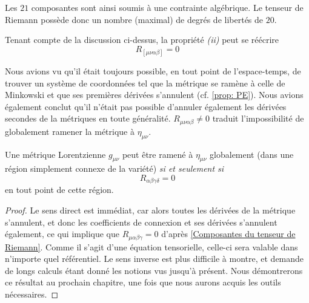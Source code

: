 Les $21$ composantes sont ainsi soumis à une contrainte algébrique. Le tenseur de Riemann possède donc un nombre (maximal) de degrés de libertés de $20$. 
\begin{rmk}
    Tenant compte de la discussion ci-dessus, la propriété \emph{(ii)} peut se réécrire 
    \begin{equation}
        R_{[\mu\nu\alpha\beta]} = 0
    \end{equation}
\end{rmk}
Nous avions vu qu'il était toujours possible, en tout point de l'espace-temps, de trouver un système de coordonnées tel que la métrique se ramène à celle de Minkowski et que ses premières dérivées s'annulent (cf. \ref{prop: PE}). Nous avions également conclut qu'il n'était pas possible d'annuler également les dérivées secondes de la métriques en toute généralité. $R_{\mu\nu\alpha\beta} \neq 0$ traduit l'impossibilité de globalement ramener la métrique à $\eta_{\mu\nu}$.
\begin{theoremframe}
    \begin{theorem}
        Une métrique Lorentzienne $g_{\mu \nu}$ peut être ramené à $\eta_{\mu \nu}$ globalement (dans une région simplement connexe de la variété) \emph{si et seulement si}
        \begin{equation}
            R_{\alpha \beta \gamma \delta} =0
        \end{equation}
        en tout point de cette région.
    \end{theorem}
\end{theoremframe}
\begin{proof}
    Le sens direct est immédiat, car alors toutes les dérivées de la métrique s'annulent, et donc les coefficients de connexion et ses dérivées s'annulent également, ce qui implique que $R_{\mu \alpha \beta \gamma} = 0$ d'après \ref{Composantes du tenseur de Riemann}. Comme il s'agit d'une équation tensorielle, celle-ci sera valable dans n'importe quel référentiel. Le sens inverse est plus difficile à montre, et demande de longs calculs étant donné les notions vus jusqu'à présent. Nous démontrerons ce résultat au prochain chapitre, une fois que nous aurons acquis les outils nécessaires.
\end{proof}

